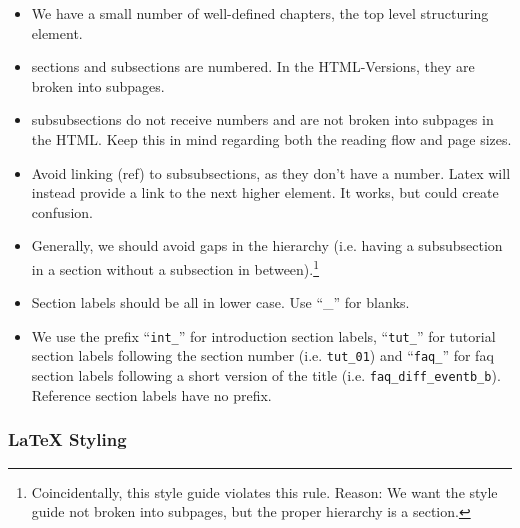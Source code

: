 \begin{itemize}
	\item We have a small number of well-defined chapters, the top level structuring element.
	\item sections and subsections are numbered.  In the HTML-Versions, they are broken into subpages.
    \item subsubsections do not receive numbers and are not broken into subpages in the HTML.  Keep this in mind regarding both the reading flow and page sizes.
	\item Avoid linking (ref) to subsubsections, as they don't have a number.  Latex will instead provide a link to the next higher element.  It works, but could create confusion.
	\item Generally, we should avoid gaps in the hierarchy (i.e. having a subsubsection in a section without a subsection in between).\footnote{Coincidentally, this style guide violates this rule. Reason: We want the style guide not broken into subpages, but the proper hierarchy is a section.}
	\item Section labels should be all in lower case. Use ``\_'' for blanks.
	\item We use the prefix ``\texttt{int\_}'' for introduction section labels, ``\texttt{tut\_}'' for tutorial section labels following the section number (i.e. \texttt{tut\_01}) and ``\texttt{faq\_}'' for faq section labels following a short version of the title (i.e. \texttt{faq\_diff\_eventb\_b}). Reference section labels have no prefix.
\end{itemize}

\subsubsection{\LaTeX{} Styling}

